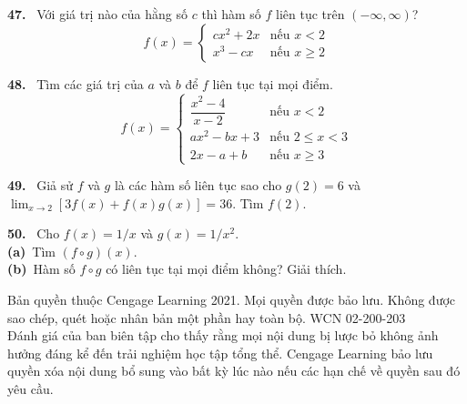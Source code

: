 \begin{minipage}[t]{0.485\textwidth}
\vspace{7pt}
\noindent
\textbf{47.} \ Với giá trị nào của hằng số $c$ thì hàm số $f$ liên tục trên $(-\infty, \infty)$?
\[
f(x) = \begin{cases}
cx^2 + 2x & \text{nếu } x < 2 \\[2pt]
x^3 - cx & \text{nếu } x \ge 2
\end{cases}
\]

\vspace{6pt}
\noindent
\textbf{48.} \ Tìm các giá trị của $a$ và $b$ để $f$ liên tục tại mọi điểm.
\[
f(x) = \begin{cases}
\dfrac{x^2 - 4}{x - 2} & \text{nếu } x < 2 \\[9pt]
ax^2 - bx + 3 & \text{nếu } 2 \le x < 3 \\[2pt]
2x - a + b & \text{nếu } x \ge 3
\end{cases}
\]

\vspace{6pt}
\noindent
\textbf{49.} \ Giả sử $f$ và $g$ là các hàm số liên tục sao cho $g(2) = 6$ và $\lim_{x \to 2} [3f(x) + f(x)g(x)] = 36$. Tìm $f(2)$.

\vspace{6pt}
\noindent
\textbf{50.} \ Cho $f(x) = 1/x$ và $g(x) = 1/x^2$.\\
\hspace*{1.2em}\textbf{(a)}~Tìm $(f \circ g)(x)$.\\
\hspace*{1.2em}\textbf{(b)}~Hàm số $f \circ g$ có liên tục tại mọi điểm không? Giải thích.

\end{minipage}

\vfill
\begin{center}
  \tiny\color{gray}
  Bản quyền thuộc Cengage Learning 2021. Mọi quyền được bảo lưu. Không được sao chép, quét hoặc nhân bản một phần hay toàn bộ. WCN 02-200-203\\
  Đánh giá của ban biên tập cho thấy rằng mọi nội dung bị lược bỏ không ảnh hưởng đáng kể đến trải nghiệm học tập tổng thể. Cengage Learning bảo lưu quyền xóa nội dung bổ sung vào bất kỳ lúc nào nếu các hạn chế về quyền sau đó yêu cầu.
\end{center}
